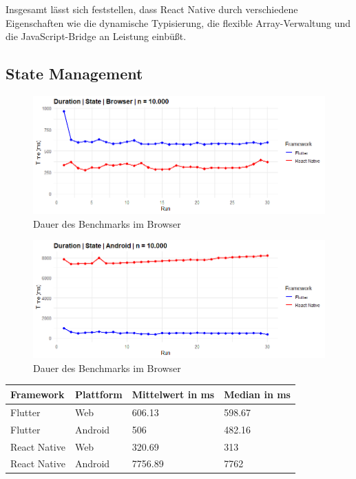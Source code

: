 Insgesamt lässt sich feststellen, dass React Native durch verschiedene Eigenschaften wie die dynamische Typisierung, die flexible Array-Verwaltung und die JavaScript-Bridge an Leistung einbüßt.

\newpage
\subsection{State Management}
\begin{figure}[H]
    \centering
    \includegraphics[width=1\linewidth]{images/web/State.png}
    \caption{Dauer des Benchmarks im Browser}
\end{figure}

\begin{figure}[H]
    \centering
    \includegraphics[width=1\linewidth]{images/android/State.png}
    \caption{Dauer des Benchmarks im Browser}
\end{figure}

\begin{table}[h!]
    \centering
    \begin{tabular}{llll}
    \toprule
    \textbf{Framework} & \textbf{Plattform} & \textbf{Mittelwert in ms} & \textbf{Median in ms} \\
    \midrule
        Flutter & Web & 606.13 & 598.67 \\
        Flutter & Android & 506 & 482.16 \\
        React Native & Web & 320.69 & 313 \\
        React Native & Android & 7756.89 & 7762 \\
    \bottomrule
    \end{tabular}
\end{table}

